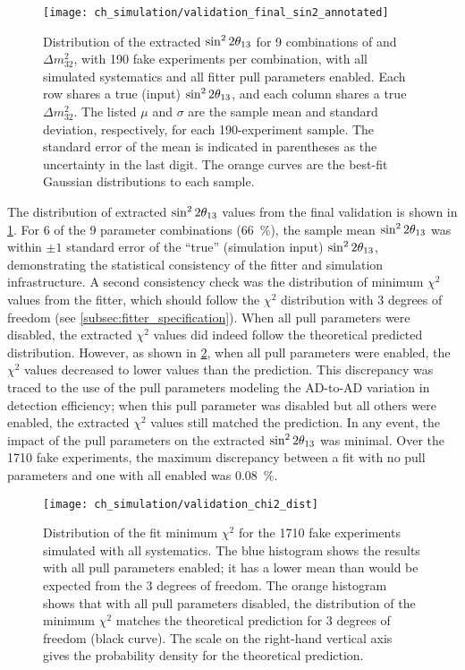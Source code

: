 \begin{figure}
    \centering
    \texttt{[image: ch\_simulation/validation\_final\_sin2\_annotated]}
    \caption[Fitter validation results]{
        Distribution of the extracted $\sin^22\theta_{13}{}$
        for 9 combinations of \thetaot{} and $\Delta m^2_{32}${},
        with 190 fake experiments per combination,
        with all simulated systematics and all fitter pull parameters enabled.
        Each row shares a true (input) $\sin^22\theta_{13}{}$,
        and each column shares a true $\Delta m^2_{32}$.
        The listed $\mu$ and $\sigma$ are the sample mean and standard deviation,
        respectively, for each 190-experiment sample.
        The standard error of the mean is indicated in parentheses
        as the uncertainty in the last digit.
        The orange curves are the best-fit Gaussian distributions
        to each sample.
    }
    \label{fig:final_validation}
\end{figure}

The distribution of extracted $\sin^22\theta_{13}$ values from the final validation
is shown in \cref{fig:final_validation}.
For 6 of the 9 parameter combinations (\SI{66}{\percent}),
the sample mean $\sin^22\theta_{13}$
was within $\pm1$ standard error of the ``true'' (simulation input) $\sin^22\theta_{13}$,
demonstrating the statistical consistency of the fitter and simulation infrastructure.
A second consistency check was the distribution of minimum $\chi^2$ values
from the fitter,
which should follow the $\chi^2$ distribution with 3 degrees of freedom
(see \cref{subsec:fitter_specification}).
When all pull parameters were disabled, the extracted $\chi^2$ values
did indeed follow the theoretical predicted distribution.
However, as shown in \cref{fig:validation_chi2},
when all pull parameters were enabled,
the $\chi^2$ values decreased to lower values than the prediction.
This discrepancy was traced to the use of the pull parameters
modeling the AD-to-AD variation in detection efficiency;
when this pull parameter was disabled but all others were enabled,
the extracted $\chi^2$ values still matched the prediction.
In any event, the impact of the pull parameters
on the extracted $\sin^22\theta_{13}{}$ was minimal.
Over the 1710 fake experiments, the maximum discrepancy
between a fit with no pull parameters and one with all enabled
was \SI{0.08}{\percent}.

\begin{figure}
    \centering
    \texttt{[image: ch\_simulation/validation\_chi2\_dist]}
    \caption[Fitter validation $\chi^2$ distribution]{
        Distribution of the fit minimum $\chi^2$
        for the \num{1710} fake experiments
        simulated with all systematics.
        The blue histogram shows the results with all pull parameters enabled;
        it has a lower mean than would be expected from the 3 degrees of freedom.
        The orange histogram shows that with all pull parameters disabled,
        the distribution of the minimum $\chi^2$ matches the theoretical prediction
        for 3 degrees of freedom (black curve).
        The scale on the right-hand vertical axis gives the probability density
        for the theoretical prediction.
    }
    \label{fig:validation_chi2}
\end{figure}


